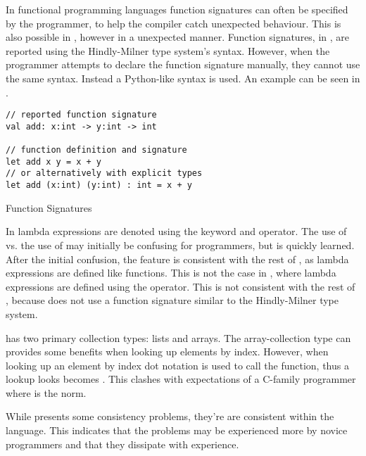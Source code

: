 In functional programming languages function signatures can often be specified by the programmer, to help the compiler catch unexpected behaviour. This is also possible in \fs, however in a unexpected manner. Function signatures, in \fs, are reported using the Hindly-Milner type system's syntax\cite{fsharp:type:inference}. However, when the programmer attempts to declare the function signature manually, they cannot use the same syntax. Instead a Python-like syntax is used. An example can be seen in .

\begin{listing}[H]
\begin{verbatim}
// reported function signature
val add: x:int -> y:int -> int

// function definition and signature
let add x y = x + y
// or alternatively with explicit types
let add (x:int) (y:int) : int = x + y
\end{verbatim}
\caption{Function Signatures}
\label{lst:fun-sig}
\end{listing}

In \fs lambda expressions are denoted using the  keyword and \ttt{-\textgreater} operator. The use of  vs. the use of  may initially be confusing for programmers, but is quickly learned. After the initial confusion, the feature is consistent with the rest of \fs, as lambda expressions are defined like functions. This is not the case in \cs, where lambda expressions are defined using the \ttt{=\textgreater} operator. This is not consistent with the rest of \cs, because \cs does not use a function signature similar to the Hindly-Milner type system.

\fs has two primary collection types: lists and arrays. The array-collection type can provides some benefits when looking up elements by index.  However, when looking up an element by index dot notation is used to call the \ttt{[]} function, thus a lookup looks becomes . This clashes with expectations of a C-family programmer where  is the norm.

While \fs presents some consistency problems, they're are consistent within the language. This indicates that the problems may be experienced more by novice programmers and that they dissipate with experience.

